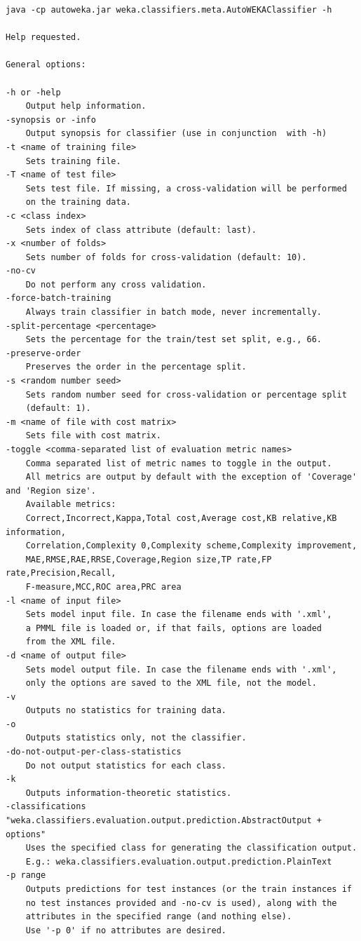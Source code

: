 \documentclass{article}
\begin{document}
\begin{verbatim}
java -cp autoweka.jar weka.classifiers.meta.AutoWEKAClassifier -h

Help requested.

General options:

-h or -help
	Output help information.
-synopsis or -info
	Output synopsis for classifier (use in conjunction  with -h)
-t <name of training file>
	Sets training file.
-T <name of test file>
	Sets test file. If missing, a cross-validation will be performed
	on the training data.
-c <class index>
	Sets index of class attribute (default: last).
-x <number of folds>
	Sets number of folds for cross-validation (default: 10).
-no-cv
	Do not perform any cross validation.
-force-batch-training
	Always train classifier in batch mode, never incrementally.
-split-percentage <percentage>
	Sets the percentage for the train/test set split, e.g., 66.
-preserve-order
	Preserves the order in the percentage split.
-s <random number seed>
	Sets random number seed for cross-validation or percentage split
	(default: 1).
-m <name of file with cost matrix>
	Sets file with cost matrix.
-toggle <comma-separated list of evaluation metric names>
	Comma separated list of metric names to toggle in the output.
	All metrics are output by default with the exception of 'Coverage' and 'Region size'.
	Available metrics:
	Correct,Incorrect,Kappa,Total cost,Average cost,KB relative,KB information,
	Correlation,Complexity 0,Complexity scheme,Complexity improvement,
	MAE,RMSE,RAE,RRSE,Coverage,Region size,TP rate,FP rate,Precision,Recall,
	F-measure,MCC,ROC area,PRC area
-l <name of input file>
	Sets model input file. In case the filename ends with '.xml',
	a PMML file is loaded or, if that fails, options are loaded
	from the XML file.
-d <name of output file>
	Sets model output file. In case the filename ends with '.xml',
	only the options are saved to the XML file, not the model.
-v
	Outputs no statistics for training data.
-o
	Outputs statistics only, not the classifier.
-do-not-output-per-class-statistics
	Do not output statistics for each class.
-k
	Outputs information-theoretic statistics.
-classifications "weka.classifiers.evaluation.output.prediction.AbstractOutput + options"
	Uses the specified class for generating the classification output.
	E.g.: weka.classifiers.evaluation.output.prediction.PlainText
-p range
	Outputs predictions for test instances (or the train instances if
	no test instances provided and -no-cv is used), along with the
	attributes in the specified range (and nothing else).
	Use '-p 0' if no attributes are desired.

\end{verbatim}
\end{document}
